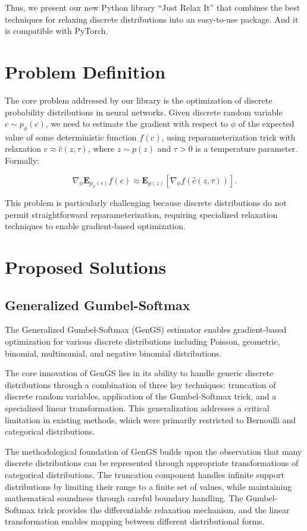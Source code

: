 \documentclass[peerreview]{IEEEtran}
\begin{document}
Thus, we present our new Python library ``Just Relax It'' that combines the best techniques for relaxing discrete distributions into an easy-to-use package. And it is compatible with PyTorch.

\section{Problem Definition}
The core problem addressed by our library is the optimization of discrete probability distributions in neural networks. Given discrete random variable $c \sim p_\phi(c)$, we need to estimate the gradient with respect to $\phi$ of the expected value of some deterministic function $f(c)$, using reparameterization trick with relaxation $c \approx \hat{c}(z, \tau)$, where $z \sim p(z)$ and $\tau > 0$ is a temperature parameter. Formally:

$$\nabla_\phi \mathbf{E}_{p_\phi(c)} f(c) \approx \mathbf{E}_{p(z)} [\nabla_\phi f(\hat{c}(z, \tau))].$$

This problem is particularly challenging because discrete distributions do not permit straightforward reparameterization, requiring specialized relaxation techniques to enable gradient-based optimization.

\section{Proposed Solutions}
\subsection{Generalized Gumbel-Softmax}
The Generalized Gumbel-Softmax (GenGS) estimator enables gradient-based optimization for various discrete distributions including Poisson, geometric, binomial, multinomial, and negative binomial distributions.

The core innovation of GenGS lies in its ability to handle generic discrete distributions through a combination of three key techniques: truncation of discrete random variables, application of the Gumbel-Softmax trick, and a specialized linear transformation. This generalization addresses a critical limitation in existing methods, which were primarily restricted to Bernoulli and categorical distributions.

The methodological foundation of GenGS builds upon the observation that many discrete distributions can be represented through appropriate transformations of categorical distributions. The truncation component handles infinite support distributions by limiting their range to a finite set of values, while maintaining mathematical soundness through careful boundary handling. The Gumbel-Softmax trick provides the differentiable relaxation mechanism, and the linear transformation enables mapping between different distributional forms.
\end{document}
